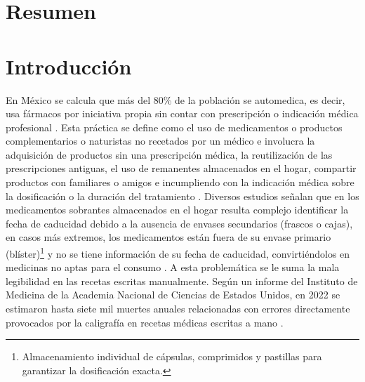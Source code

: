
\pagestyle{fancy}

\section*{Resumen} 


\clearpage

\tableofcontents

\clearpage

\listoffigures
\clearpage

\listofdiagrams
\clearpage

\lstlistoflistings
\clearpage

\listoftables
\clearpage

\setcounter{page}{1}
\pagestyle{fancy}

\section{Introducción} 

En México se calcula que más del 80\% de la población se automedica, es decir, usa fármacos por iniciativa propia sin contar con prescripción o indicación médica profesional \cite{SecSalud}. Esta práctica se define como el uso de medicamentos o productos complementarios o naturistas no recetados por un médico e involucra la adquisición de productos sin una prescripción médica, la reutilización de las prescripciones antiguas, el uso de remanentes almacenados en el hogar, compartir productos con familiares o amigos e incumpliendo con la indicación médica sobre la dosificación o la duración del tratamiento \cite{ugto}. Diversos estudios señalan que en los medicamentos sobrantes almacenados en el hogar resulta complejo identificar la fecha de caducidad debido a la ausencia de envases secundarios (frascos o cajas), en casos más extremos, los medicamentos están fuera de su envase primario (blíster)\footnote{Almacenamiento individual de cápsulas, comprimidos y pastillas para garantizar la dosificación exacta.} y no se tiene información de su fecha de caducidad, convirtiéndolos en medicinas no aptas para el consumo \cite{ResMedicamentos}. A esta problemática se le suma la mala legibilidad en las recetas escritas manualmente. Según un informe del Instituto de Medicina de la Academia Nacional de Ciencias de Estados Unidos, en 2022 se estimaron hasta siete mil muertes anuales relacionadas con errores directamente provocados por la caligrafía en recetas médicas escritas a mano \cite{elsoldedurango}.

